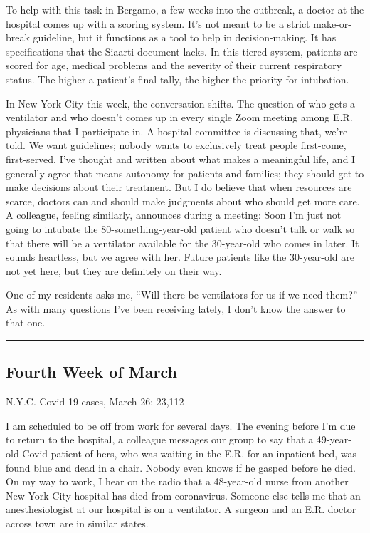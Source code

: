 To help with this task in Bergamo, a few weeks into the outbreak, a
doctor at the hospital comes up with a scoring system. It's not meant to
be a strict make-or-break guideline, but it functions as a tool to help
in decision-making. It has specifications that the Siaarti document
lacks. In this tiered system, patients are scored for age, medical
problems and the severity of their current respiratory status. The
higher a patient's final tally, the higher the priority for intubation.

In New York City this week, the conversation shifts. The question of who
gets a ventilator and who doesn't comes up in every single Zoom meeting
among E.R. physicians that I participate in. A hospital committee is
discussing that, we're told. We want guidelines; nobody wants to
exclusively treat people first-come, first-served. I've thought and
written about what makes a meaningful life, and I generally agree that
means autonomy for patients and families; they should get to make
decisions about their treatment. But I do believe that when resources
are scarce, doctors can and should make judgments about who should get
more care. A colleague, feeling similarly, announces during a meeting:
Soon I'm just not going to intubate the 80-something-year-old patient
who doesn't talk or walk so that there will be a ventilator available
for the 30-year-old who comes in later. It sounds heartless, but we
agree with her. Future patients like the 30-year-old are not yet here,
but they are definitely on their way.

One of my residents asks me, ``Will there be ventilators for us if we
need them?'' As with many questions I've been receiving lately, I don't
know the answer to that one.

\begin{center}\rule{0.5\linewidth}{\linethickness}\end{center}

\hypertarget{fourth-week-of-march-2}{%
\subsection{Fourth Week of March}\label{fourth-week-of-march-2}}

N.Y.C. Covid-19 cases, March 26: 23,112

I am scheduled to be off from work for several days. The evening before
I'm due to return to the hospital, a colleague messages our group to say
that a 49-year-old Covid patient of hers, who was waiting in the E.R.
for an inpatient bed, was found blue and dead in a chair. Nobody even
knows if he gasped before he died. On my way to work, I hear on the
radio that a 48-year-old nurse from another New York City hospital has
died from coronavirus. Someone else tells me that an anesthesiologist at
our hospital is on a ventilator. A surgeon and an E.R. doctor across
town are in similar states.

